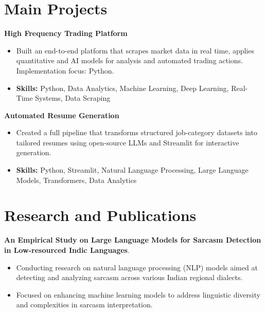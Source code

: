 \documentclass[a4paper,11pt]{article}
\begin{document}
\section{\textbf{Main Projects}}

\vspace{1mm}
  \textbf{High Frequency Trading Platform  }
\vspace{-1.5mm} %
\begin{itemize}
  \item Built an end-to-end platform that scrapes market data in real time, applies quantitative and AI models for analysis and automated trading actions. Implementation focus: Python.
\vspace{-3mm}
  \item \textbf{Skills:} Python, Data Analytics, Machine Learning, Deep Learning, Real-Time Systems, Data Scraping
\end{itemize}


\vspace{1mm}
   \textbf{Automated Resume Generation }
\vspace{-1.5mm} %
\begin{itemize}
  \item Created a full pipeline that transforms structured job-category datasets into tailored resumes using open-source LLMs and Streamlit for interactive generation.
\vspace{-3mm}
  \item \textbf{Skills:} Python, Streamlit, Natural Language Processing, Large Language Models, Transformers, Data Analytics
\end{itemize}



\section{\textbf{Research and Publications} \hfill }
\vspace{1mm}
  \textbf{An Empirical Study on Large Language Models for Sarcasm Detection in Low-resourced Indic Languages}.
\vspace{-1mm} %
\begin{itemize}
  \item Conducting research on natural language processing (NLP) models aimed at detecting and analyzing sarcasm across various Indian regional dialects.
\vspace{-3mm}
  \item Focused on enhancing machine learning models to address linguistic diversity and complexities in sarcasm interpretation.
\end{itemize}
\end{document}
